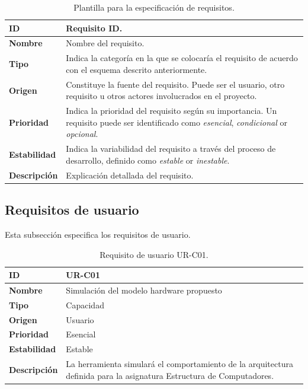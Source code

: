 \begin{center}
\begin{table}[htbp]
\centering
\caption{Plantilla para la especificación de requisitos.}
\begin{tabular}{@{}p{2.5cm} p{9cm}@{}} 
\toprule
\textbf{ID} 				& Requisito ID. \\
\midrule
\textbf{Nombre} 			& Nombre del requisito. \\
\midrule
\textbf{Tipo} 			& Indica la categoría en la que se colocaría el requisito de acuerdo con el esquema descrito anteriormente. \\
\midrule
\textbf{Origen} 			& Constituye la fuente del requisito. Puede ser el usuario, otro requisito u otros actores involucrados en el proyecto. \\
\midrule
\textbf{Prioridad}		& Indica la prioridad del requisito según su importancia. Un requisito puede ser identificado como \textit{esencial}, \textit{condicional} or \textit{opcional}. \\
\midrule
\textbf{Estabilidad} 		& Indica la variabilidad del requisito a través del proceso de desarrollo, definido como \textit{estable} or \textit{inestable}. \\
\midrule
\textbf{Descripción} 	& Explicación detallada del requisito. \\
\bottomrule
\end{tabular}
\label{tab:requirements_template}
\end{table}
\end{center}

\clearpage
\subsection{Requisitos de usuario}
\label{sec:user_requirements}

Esta subsección especifica los requisitos de usuario.

\begin{center}
\begin{table}[htbp]
\centering
\caption{Requisito de usuario UR-C01.}
\begin{tabular}{@{}p{2.5cm} p{9cm}@{}} 
\toprule
\textbf{ID} 				& UR-C01 \\
\midrule
\textbf{Nombre} 			& Simulación del modelo \gls{hardware} propuesto\\
\midrule
\textbf{Tipo} 			& Capacidad \\
\midrule
\textbf{Origen} 			& Usuario \\
\midrule
\textbf{Prioridad}		& Esencial \\
\midrule
\textbf{Estabilidad} 		& Estable \\
\midrule
\textbf{Descripción} 	& La herramienta simulará el comportamiento de la arquitectura definida para la asignatura Estructura de Computadores. \\
\bottomrule
\end{tabular}
\label{tab:urc01}
\end{table}
\end{center}

